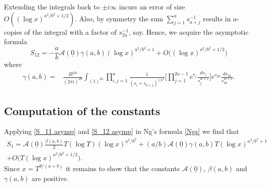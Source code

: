 \documentclass[oneside, 12pt]{amsart}
\theoremstyle{definition}
\newcommand{\mc}{\mathcal}
\newcommand{\ul}{\underline}
\begin{document}
Extending the integrals back to $\pm i\infty$ incurs an error of size $O((\log x)^{a^2/b^2+1/2})$. Also, by symmetry the sum $\sum_{j=1}^a s_{a+j}^{-1}$ results in $a$-copies of the integral with a factor of $s_{2a}^{-1}$, say. Hence, we acquire the asymptotic formula
\begin{equation}
\label{S_12 asymp}
S_{12}= -\frac{a}{b}\mc{A}(\ul{0})\gamma(a,b)(\log x)^{a^2/b^2+1} + O \big( (\log x)^{a^2/b^2+1/2}\big)
\end{equation}
where
\begin{align*}
\gamma(a,b) = & \frac{B!^{2a}}{(2\pi i)^{2a}} \int_{(1)^{2a}} \prod_{i,j=1}^a\frac{1}{(s_i+s_{a+j})^{1/b^2}}\bigg[\prod_{j=1}^{2a-1}e^{s_j}\frac{ds_j}{s_j^{B+1}}\bigg]
e^{s_{2a}}\frac{ds_{2a}}{s_{2a}^{B+2}}.
\end{align*}

\subsection{Computation of the constants}\label{constants sec}

Applying \eqref{S_11 asymp} and \eqref{S_12 asymp} in Ng's formula \eqref{Ngs} we find that 
\begin{multline*}
S_1=\mc{A}(\ul{0})\frac{\beta(a,b)}{2}T(\log T)(\log x)^{a^2/b^2}+(a/b)\mc{A}(\ul{0})\gamma(a,b)T(\log x)^{a^2/b^2+1}
\\+O \big( T(\log x)^{a^2/b^2+1/2}\big).
\end{multline*}
Since $x=T^{\theta/(a+b)}$ it remains to show that the constants $\mc{A}(\ul{0})$, $\beta(a,b)$ and $\gamma(a,b)$ are positive.
\end{document}
